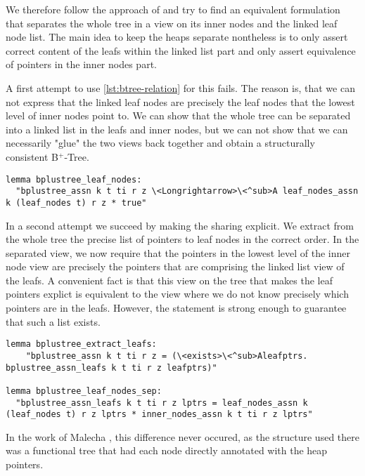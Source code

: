 \documentclass[a4paper,UKenglish,cleveref, autoref, thm-restate]{lipics-v2021}
\newcommand{\btree}{B$^+$-Tree}
\begin{document}
We therefore follow the approach of \cite{DBLP:conf/popl/MalechaMSW10} and
try to find an equivalent formulation that separates the whole tree in a
view on its inner nodes and the linked leaf node list.
The main idea to keep the heaps separate nontheless is to only
assert correct content of the leafs within the linked list part
and only assert equivalence of pointers in the inner nodes part.

A first attempt to use \autoref{lst:btree-relation} for this fails.
The reason is, that we can not express that the linked leaf nodes
are precisely the leaf nodes that the lowest level of inner nodes point to.
We can show that the whole tree can be separated into a linked list in the leafs
and inner nodes, but we can not show that we can necessarily "glue" the two views
back together and obtain a structurally consistent \btree.

\begin{lstlisting}[mathescape=true, language=Isabelle,label=lst:btree-view-split-oneway]
lemma bplustree_leaf_nodes:
  "bplustree_assn k t ti r z \<Longrightarrow>\<^sub>A leaf_nodes_assn k (leaf_nodes t) r z * true"
\end{lstlisting}


In a second attempt we succeed by making the sharing explicit.
We extract from the whole tree the precise list of pointers to leaf nodes
in the correct order.
In the separated view, we now require that the pointers
in the lowest level of the inner node view are precisely the pointers
that are comprising the linked list view of the leafs.
A convenient fact is that this view on the tree that makes the leaf pointers explict
is equivalent to the view where we do not know precisely which pointers are in the leafs.
However, the statement is strong enough to guarantee that such a list exists.


\begin{lstlisting}[mathescape=true, language=Isabelle,label=lst:btree-view-split]
lemma bplustree_extract_leafs:
    "bplustree_assn k t ti r z = (\<exists>\<^sub>Aleafptrs. bplustree_assn_leafs k t ti r z leafptrs)"

lemma bplustree_leaf_nodes_sep:
  "bplustree_assn_leafs k t ti r z lptrs = leaf_nodes_assn k (leaf_nodes t) r z lptrs * inner_nodes_assn k t ti r z lptrs"
\end{lstlisting}

In the work of Malecha \cite{DBLP:conf/popl/MalechaMSW10}, this
difference never occured, as the structure used there was a functional tree
that had each node directly annotated with the heap pointers.
\end{document}
